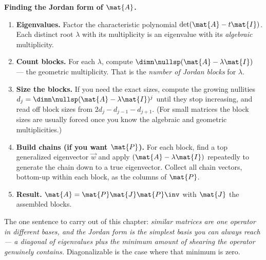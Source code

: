 \begin{formalbox}
\textbf{Finding the Jordan form of $\mat{A}$.}
\begin{enumerate}
\item \textbf{Eigenvalues.} Factor the characteristic polynomial
  $\det(\mat{A}-t\mat{I})$. Each distinct root $\lambda$ with its multiplicity is an
  eigenvalue with its \emph{algebraic} multiplicity.
\item \textbf{Count blocks.} For each $\lambda$, compute
  $\dimn\nullsp(\mat{A}-\lambda\mat{I})$ --- the geometric multiplicity. That is the
  \emph{number of Jordan blocks} for $\lambda$.
\item \textbf{Size the blocks.} If you need the exact sizes, compute the growing
  nullities $d_j=\dimn\nullsp(\mat{A}-\lambda\mat{I})^j$ until they stop increasing, and
  read off block sizes from $2d_j-d_{j-1}-d_{j+1}$. (For small matrices the block sizes
  are usually forced once you know the algebraic and geometric multiplicities.)
\item \textbf{Build chains (if you want $\mat{P}$).} For each block, find a top
  generalized eigenvector $\vec{w}$ and apply $(\mat{A}-\lambda\mat{I})$ repeatedly to
  generate the chain down to a true eigenvector. Collect all chain vectors, bottom-up
  within each block, as the columns of $\mat{P}$.
\item \textbf{Result.} $\mat{A}=\mat{P}\mat{J}\mat{P}\inv$ with $\mat{J}$ the assembled
  blocks.
\end{enumerate}
\end{formalbox}

\begin{focusbox}
The one sentence to carry out of this chapter: \emph{similar matrices are one operator in
different bases, and the Jordan form is the simplest basis you can always reach --- a
diagonal of eigenvalues plus the minimum amount of shearing the operator genuinely
contains.} Diagonalizable is the case where that minimum is zero.
\end{focusbox}

